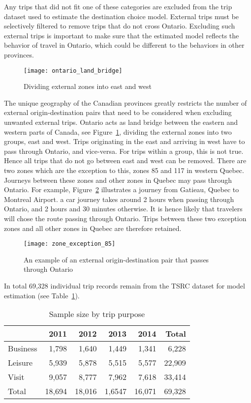 Any trips that did not fit one of these categories are excluded from the trip dataset used to estimate the destination choice model. External trips must be selectively filtered to remove trips that do not cross Ontario. Excluding such external trips is important to make sure that the estimated model reflects the behavior of travel in Ontario, which could be different to the behaviors in other provinces. 

\begin{figure}[H]
\centering
\texttt{[image: ontario\_land\_bridge]}
\caption{Dividing external zones into east and west}
\label{fig:bridge}
\end{figure}

The unique geography of the Canadian provinces greatly restricts the number of external origin-destination pairs that need to be considered when excluding unwanted external trips. Ontario acts as land bridge between the eastern and western parts of Canada, see Figure~\ref{fig:bridge}, dividing the external zones into two groups, east and west. Trips originating in the east and arriving in west have to pass through Ontario, and vice-versa. For trips within a group, this is not true. Hence all trips that do not go between east and west can be removed. There are two zones which are the exception to this, zones 85 and 117 in western Quebec. Journeys between these zones and other zones in Quebec may pass through Ontario. For example, Figure~\ref{fig:exception85} illustrates a journey from Gatieau, Quebec to Montreal Airport. a car journey takes around 2 hours when passing through Ontario, and 2 hours and 30 minutes otherwise. It is hence likely that travelers will chose the route passing through Ontario. Trips between these two exception zones and all other zones in Quebec are therefore retained. 

\begin{figure}[H]
\centering
\texttt{[image: zone\_exception\_85]}
\caption{An example of an external origin-destination pair that passes through Ontario}
\label{fig:exception85}
\end{figure}

In total 69,328 individual trip records remain from the TSRC dataset for model estimation (see Table~\ref{table:purpose-counts}). 

\begin{table}[H]
\centering
\caption{Sample size by trip purpose}
\label{table:purpose-counts}
\begin{tabular}{lrrrrr}
\toprule
			& 2011 	& 2012 	& 2013 	& 2014 	& Total \\
\midrule
Business 	& 1,798  & 1,640  & 1,449  & 1,341  & 6,228 \\
Leisure 	& 5,939  & 5,878  & 5,515  & 5,577  & 22,909 \\
Visit 		& 9,057  & 8,777  & 7,962  & 7,618  & 33,414 \\ 
\midrule
Total 		& 18,694 & 18,016 & 1,6547 & 16,071 & 69,328 \\ 
\bottomrule
\end{tabular}%

\end{table}

